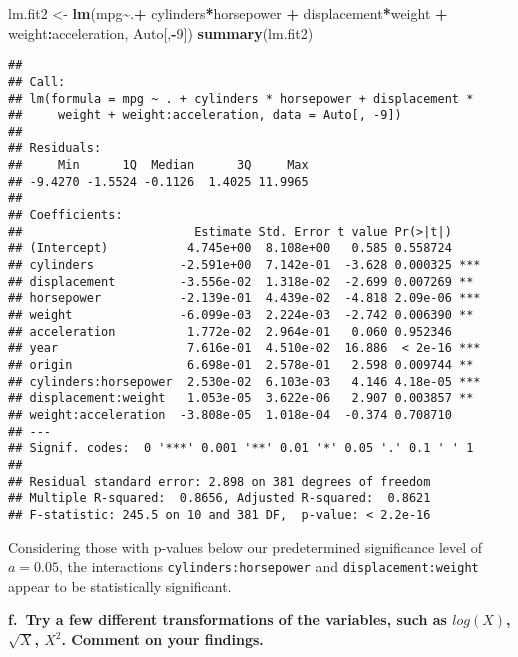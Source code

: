 \documentclass[
]{article}
\newenvironment{Shaded}{\begin{snugshade}}{\end{snugshade}}
\newcommand{\DecValTok}[1]{\textcolor[rgb]{0.00,0.00,0.81}{#1}}
\newcommand{\FunctionTok}[1]{\textcolor[rgb]{0.13,0.29,0.53}{\textbf{#1}}}
\newcommand{\NormalTok}[1]{#1}
\newcommand{\OtherTok}[1]{\textcolor[rgb]{0.56,0.35,0.01}{#1}}
\newcommand{\SpecialCharTok}[1]{\textcolor[rgb]{0.81,0.36,0.00}{\textbf{#1}}}
\begin{document}
\begin{Shaded}
\begin{Highlighting}[]
\NormalTok{lm.fit2 }\OtherTok{\textless{}{-}} \FunctionTok{lm}\NormalTok{(mpg}\SpecialCharTok{\textasciitilde{}}\NormalTok{.}\SpecialCharTok{+}\NormalTok{ cylinders}\SpecialCharTok{*}\NormalTok{horsepower }\SpecialCharTok{+}\NormalTok{ displacement}\SpecialCharTok{*}\NormalTok{weight }\SpecialCharTok{+}\NormalTok{ weight}\SpecialCharTok{:}\NormalTok{acceleration, Auto[,}\SpecialCharTok{{-}}\DecValTok{9}\NormalTok{])}
\FunctionTok{summary}\NormalTok{(lm.fit2)}
\end{Highlighting}
\end{Shaded}

\begin{verbatim}
## 
## Call:
## lm(formula = mpg ~ . + cylinders * horsepower + displacement * 
##     weight + weight:acceleration, data = Auto[, -9])
## 
## Residuals:
##     Min      1Q  Median      3Q     Max 
## -9.4270 -1.5524 -0.1126  1.4025 11.9965 
## 
## Coefficients:
##                        Estimate Std. Error t value Pr(>|t|)    
## (Intercept)           4.745e+00  8.108e+00   0.585 0.558724    
## cylinders            -2.591e+00  7.142e-01  -3.628 0.000325 ***
## displacement         -3.556e-02  1.318e-02  -2.699 0.007269 ** 
## horsepower           -2.139e-01  4.439e-02  -4.818 2.09e-06 ***
## weight               -6.099e-03  2.224e-03  -2.742 0.006390 ** 
## acceleration          1.772e-02  2.964e-01   0.060 0.952346    
## year                  7.616e-01  4.510e-02  16.886  < 2e-16 ***
## origin                6.698e-01  2.578e-01   2.598 0.009744 ** 
## cylinders:horsepower  2.530e-02  6.103e-03   4.146 4.18e-05 ***
## displacement:weight   1.053e-05  3.622e-06   2.907 0.003857 ** 
## weight:acceleration  -3.808e-05  1.018e-04  -0.374 0.708710    
## ---
## Signif. codes:  0 '***' 0.001 '**' 0.01 '*' 0.05 '.' 0.1 ' ' 1
## 
## Residual standard error: 2.898 on 381 degrees of freedom
## Multiple R-squared:  0.8656, Adjusted R-squared:  0.8621 
## F-statistic: 245.5 on 10 and 381 DF,  p-value: < 2.2e-16
\end{verbatim}

Considering those with p-values below our predetermined significance
level of \(a = 0.05\), the interactions \texttt{cylinders:horsepower}
and \texttt{displacement:weight} appear to be statistically significant.

\textbf{f.~Try a few different transformations of the variables, such as
\(log(X)\),\(\sqrt{X}\), \(X^2\). Comment on your findings.}
\end{document}
